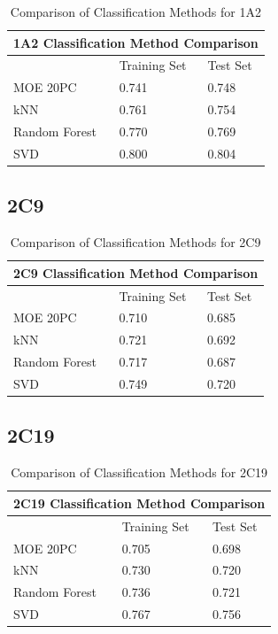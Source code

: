 \begin{table}[h]
\begin{tabular}{|l|l|l|}
\hline
\multicolumn{3}{|c|}{1A2 Classification Method Comparison} \\ \hline
          & Training Set & Test Set \\ \hline
MOE 20PC  & 0.741        & 0.748    \\ \hline
kNN       & 0.761        & 0.754    \\ \hline
Random Forest & 0.770    & 0.769    \\ \hline
SVD       & 0.800        & 0.804    \\ \hline
\end{tabular}
\caption{Comparison of Classification Methods for 1A2}
\end{table}

\subsection{2C9}

\begin{table}[h]
\begin{tabular}{|l|l|l|}
\hline
\multicolumn{3}{|c|}{2C9 Classification Method Comparison} \\ \hline
          & Training Set & Test Set \\ \hline
MOE 20PC  & 0.710        & 0.685    \\ \hline
kNN       & 0.721        & 0.692    \\ \hline
Random Forest & 0.717    & 0.687    \\ \hline
SVD       & 0.749        & 0.720    \\ \hline
\end{tabular}
\caption{Comparison of Classification Methods for 2C9}
\end{table}

\subsection{2C19}

\begin{table}[h]
\begin{tabular}{|l|l|l|}
\hline
\multicolumn{3}{|c|}{2C19 Classification Method Comparison} \\ \hline
          & Training Set & Test Set \\ \hline
MOE 20PC  & 0.705        & 0.698    \\ \hline
kNN       & 0.730        & 0.720    \\ \hline
Random Forest & 0.736    & 0.721    \\ \hline
SVD       & 0.767        & 0.756    \\ \hline
\end{tabular}
\caption{Comparison of Classification Methods for 2C19}
\end{table}

